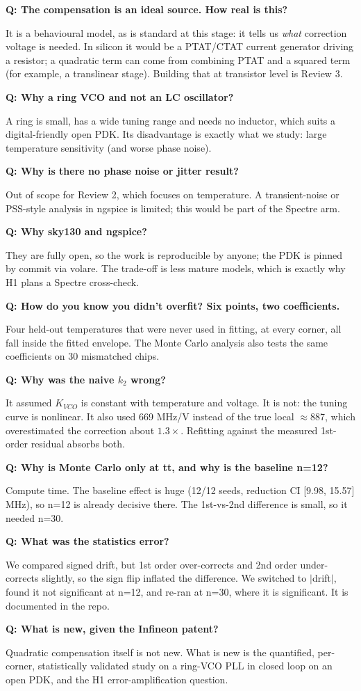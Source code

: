 \documentclass[11pt,a4paper]{article}
\newcommand{\qa}[2]{\par\smallskip\noindent\textbf{Q: #1}\par\noindent\hspace*{1em}\begin{minipage}[t]{\dimexpr\linewidth-1em}#2\end{minipage}\par}
\begin{document}
\qa{The compensation is an ideal source. How real is this?}{It is a behavioural model, as is standard at this stage: it tells us \emph{what} correction voltage is needed. In silicon it would be a PTAT/CTAT current generator driving a resistor; a quadratic term can come from combining PTAT and a squared term (for example, a translinear stage). Building that at transistor level is Review 3.}

\qa{Why a ring VCO and not an LC oscillator?}{A ring is small, has a wide tuning range and needs no inductor, which suits a digital-friendly open PDK. Its disadvantage is exactly what we study: large temperature sensitivity (and worse phase noise).}

\qa{Why is there no phase noise or jitter result?}{Out of scope for Review 2, which focuses on temperature. A transient-noise or PSS-style analysis in ngspice is limited; this would be part of the Spectre arm.}

\qa{Why sky130 and ngspice?}{They are fully open, so the work is reproducible by anyone; the PDK is pinned by commit via volare. The trade-off is less mature models, which is exactly why H1 plans a Spectre cross-check.}

\qa{How do you know you didn't overfit? Six points, two coefficients.}{Four held-out temperatures that were never used in fitting, at every corner, all fall inside the fitted envelope. The Monte Carlo analysis also tests the same coefficients on 30 mismatched chips.}

\qa{Why was the naive $k_2$ wrong?}{It assumed $K_{VCO}$ is constant with temperature and voltage. It is not: the tuning curve is nonlinear. It also used 669 MHz/V instead of the true local $\approx$887, which overestimated the correction about $1.3\times$. Refitting against the measured 1st-order residual absorbs both.}

\qa{Why is Monte Carlo only at tt, and why is the baseline n=12?}{Compute time. The baseline effect is huge (12/12 seeds, reduction CI [9.98, 15.57] MHz), so n=12 is already decisive there. The 1st-vs-2nd difference is small, so it needed n=30.}

\qa{What was the statistics error?}{We compared signed drift, but 1st order over-corrects and 2nd order under-corrects slightly, so the sign flip inflated the difference. We switched to $|$drift$|$, found it not significant at n=12, and re-ran at n=30, where it is significant. It is documented in the repo.}

\qa{What is new, given the Infineon patent?}{Quadratic compensation itself is not new. What is new is the quantified, per-corner, statistically validated study on a ring-VCO PLL in closed loop on an open PDK, and the H1 error-amplification question.}
\end{document}
